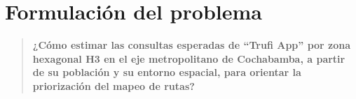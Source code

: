\section{Formulación del problema}
\label{sec:formulacion-problema}

\begin{quote}
  \textbf{¿Cómo estimar las consultas esperadas de ``Trufi App'' por zona hexagonal H3 en el eje
   metropolitano de Cochabamba, a partir de su población y su entorno espacial, 
   para orientar la priorización del mapeo de rutas?}
\end{quote}
